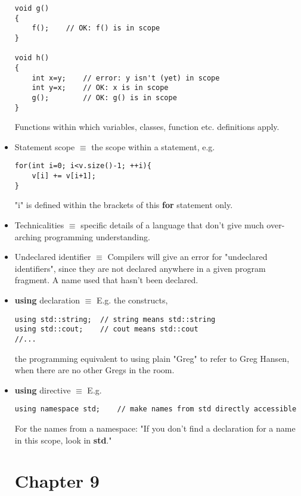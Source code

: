 \documentclass[12pt]{article}
\begin{document}
\begin{itemize}
\begin{lstlisting}
void g()
{
	f();	// OK: f() is in scope
}

void h()
{
	int x=y;	// error: y isn't (yet) in scope
	int y=x;	// OK: x is in scope
	g();		// OK: g() is in scope
}
\end{lstlisting}

Functions within which variables, classes, function etc. definitions apply.

\item Statement scope $\equiv$ the scope within a statement, e.g.

\begin{lstlisting}
for(int i=0; i<v.size()-1; ++i){
	v[i] += v[i+1];
}
\end{lstlisting}

"i" is defined within the brackets of this \textbf{for} statement only.

\item Technicalities $\equiv$ specific details of a language that don't give much over-arching programming understanding.

\item Undeclared identifier $\equiv$ Compilers will give an error for "undeclared identifiers", since they are not declared anywhere in a given program fragment. A name used that hasn't been declared.

\item \textbf{using} declaration $\equiv$ E.g. the constructs,

\begin{lstlisting}
using std::string;	// string means std::string
using std::cout;	// cout means std::cout
//...
\end{lstlisting}

the programming equivalent to using plain "Greg" to refer to Greg Hansen, when there are no other Gregs in the room.

\item \textbf{using} directive $\equiv$ E.g.

\begin{lstlisting}
using namespace std;	// make names from std directly accessible
\end{lstlisting}

For the names from a namespace: "If you don't find a declaration for a name in this scope, look in \textbf{std}."

\section*{Chapter 9}


\end{itemize}
\end{document}
